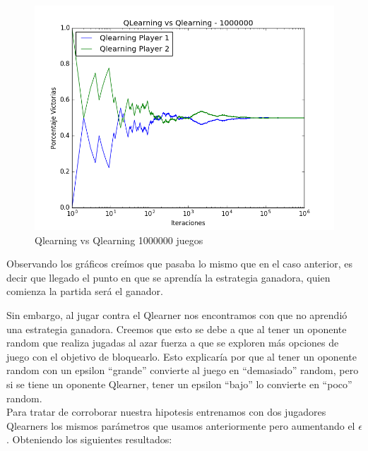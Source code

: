 \begin{figure}[h]
 \centering
 \begin{minipage}{.45\textwidth}
	\centering
	\includegraphics[scale=0.35]{img1/QlearningVsQlearning_1000000_6x5_merge.png}
        \caption{Qlearning vs Qlearning 1000000 juegos}
  \end{minipage}
\end{figure}

Observando los gráficos creímos que pasaba lo mismo que en el caso anterior, es decir que llegado el punto en que se aprendía la estrategia ganadora, quien comienza la partida será el ganador.

Sin embargo, al jugar contra el Qlearner nos encontramos con que no aprendió una estrategia ganadora. Creemos que esto se debe a que al tener un oponente random que realiza jugadas al azar fuerza a que se exploren más opciones de juego con el objetivo de bloquearlo.
Esto explicaría por que al tener un oponente random con un epsilon ``grande'' convierte al juego en ``demasiado'' random, pero si se tiene un oponente Qlearner, tener un epsilon ``bajo'' lo convierte en ``poco'' random. \\

Para tratar de corroborar nuestra hipotesis entrenamos con dos jugadores Qlearners los mismos parámetros que usamos anteriormente pero aumentando el $\epsilon$.
Obteniendo los siguientes resultados:

